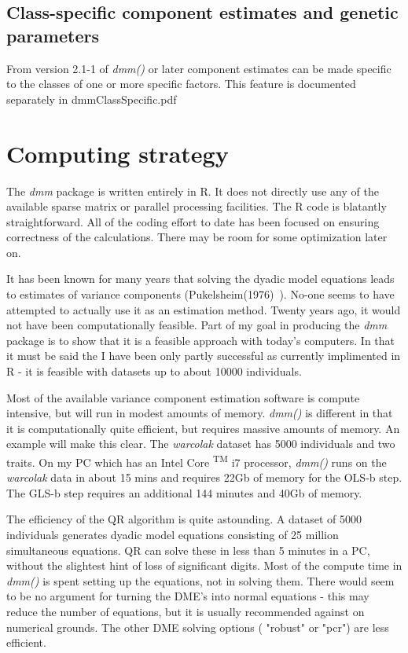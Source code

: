 \documentclass[titlepage]{article}  %
\begin{document}
\subsection{Class-specific component estimates and genetic parameters}
 From version 2.1-1 of {\em dmm()} or later component estimates  can be made specific to the classes of one or more specific factors. This feature is documented separately in dmmClassSpecific.pdf~\cite{jack:17}

\clearpage
\section{Computing strategy}
The {\em dmm} package is written entirely in R. It does not directly use any of the available sparse matrix or parallel processing facilities. The R code is blatantly straightforward. All of the coding effort to date has been focused on ensuring correctness of the calculations. There may be room for some optimization later on.

It has been known for many years that solving the dyadic model equations leads to estimates of variance components (Pukelsheim(1976)~\cite{puke:76}).  No-one seems to have attempted to actually use it as an estimation method. Twenty years ago, it would not have been computationally feasible. Part of my goal in producing the {\em dmm} package is to show that it is a feasible approach with today's computers. In that it must be said the I have been only partly successful as currently implimented in R - it is feasible with datasets up to about 10000 individuals.

Most of the available variance component estimation software is compute intensive, but will run in modest amounts of memory. {\em dmm()} is different in that it is computationally quite efficient, but requires massive amounts of memory. An example will make this clear. The {\em warcolak} dataset has 5000 individuals and two traits. On my PC which has an Intel \textregistered \hspace{1pt} Core \textsuperscript{TM} i7 processor, {\em dmm()} runs on the {\em warcolak} data in about 15 mins and requires 22Gb of memory for the OLS-b step. The GLS-b step requires an additional 144 minutes and 40Gb of memory. 

The efficiency of the QR algorithm is quite astounding. A dataset of 5000 individuals generates dyadic model equations consisting of 25 million simultaneous equations. QR can solve these in less than 5 minutes in a PC, without the slightest hint of loss of significant digits. Most of the compute time in {\em dmm()} is spent setting up the equations, not in solving them. There would seem to be no argument for turning the DME's into normal equations - this may reduce the number of equations, but it is usually recommended against on numerical grounds. The other DME solving options ( "robust" or "pcr") are less efficient.
\end{document}
